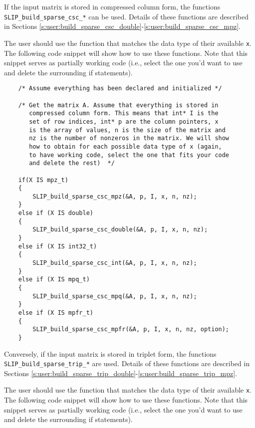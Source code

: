 \documentclass[12pt]{article}
\theoremstyle{definition}
\begin{document}
If the input matrix is stored in compressed column form, the functions \\
\verb|SLIP_build_sparse_csc_*| can be used. Details of these functions are
described in Sections
\ref{s:user:build_sparse_csc_double}-\ref{s:user:build_sparse_csc_mpz}.

The user should use the function that matches the data type of their available
\verb|x|. The following code snippet will show how to use these functions. Note
that this snippet serves as partially working code (i.e., select the one you'd
want to use and delete the surrounding if statements).

{\small
\begin{verbatim}
    /* Assume everything has been declared and initialized */

    /* Get the matrix A. Assume that everything is stored in
       compressed column form. This means that int* I is the
       set of row indices, int* p are the column pointers, x
       is the array of values, n is the size of the matrix and
       nz is the number of nonzeros in the matrix. We will show
       how to obtain for each possible data type of x (again,
       to have working code, select the one that fits your code
       and delete the rest)  */

    if(X IS mpz_t)
    {
        SLIP_build_sparse_csc_mpz(&A, p, I, x, n, nz);
    }
    else if (X IS double)
    {
        SLIP_build_sparse_csc_double(&A, p, I, x, n, nz);
    }
    else if (X IS int32_t)
    {
        SLIP_build_sparse_csc_int(&A, p, I, x, n, nz);
    }
    else if (X IS mpq_t)
    {
        SLIP_build_sparse_csc_mpq(&A, p, I, x, n, nz);
    }
    else if (X IS mpfr_t)
    {
        SLIP_build_sparse_csc_mpfr(&A, p, I, x, n, nz, option);
    } \end{verbatim} }

Conversely, if the input matrix is stored in triplet form, the functions \\
\verb|SLIP_build_sparse_trip_*| are used. Details of these functions are
described in Sections
\ref{s:user:build_sparse_trip_double}-\ref{s:user:build_sparse_trip_mpz}.

The user should use the function that matches the data type of their available
\verb|x|. The following code snippet will show how to use these functions. Note
that this snippet serves as partially working code (i.e., select the one you'd
want to use and delete the surrounding if statements).
\end{document}
